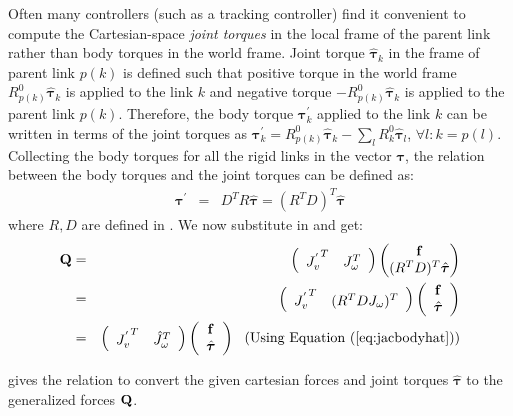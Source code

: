 Often many controllers (such as a tracking controller) find it convenient to compute the Cartesian-space \emph{joint torques} in the local frame of the parent link rather than body torques in the world frame. Joint torque $\hat{\bm{\tau}}_k$ in the frame of parent link $p(k)$ is defined such that positive torque in the world frame $R^0_{p(k)}\hat{\bm{\tau}}_k$ is applied to the link $k$ and negative torque $-R^0_{p(k)}\hat{\bm{\tau}}_k$ is applied to the parent link $p(k)$. Therefore, the body torque $\bm{\tau}^{'}_k$ applied to the link $k$ can be written in terms of the joint torques as $\bm{\tau}^{'}_k = R^0_{p(k)}\hat{\bm{\tau}}_k - \sum_l R^0_{k} \hat{\bm{\tau}}_l$, $\forall l:k=p(l)$. Collecting the body torques for all the rigid links in the vector $\bm{\tau}$, the relation between the body torques and the joint torques can be defined as:
\begin{eqnarray}
\label{eq:torquesbodyhat}
\bm{\tau}^{'} & = & D^T R \hat{\bm{\tau}} = (R^T D)^T \hat{\bm{\tau}}
\end{eqnarray}
where $R, D$ are defined in . We now substitute  in  and get:
\begin{eqnarray}
\label{eq:torques_cart2gen}
\nonumber
\vc{Q} & = & 
\left (
\begin{array}{cc}
{J^{'}_{v}}^T & J_\omega^T
\end{array}
\right )
\begin{pmatrix}
\vc{f} \\
(R^T D)^T \hat{\bm{\tau}}
\end{pmatrix}
 \\
\nonumber
& = & 
\left (
\begin{array}{cc}
{J^{'}_{v}}^T & (R^T D J_\omega)^T
\end{array}
\right )
\left (
\begin{array}{c}
\vc{f} \\
\hat{\bm{\tau}}
\end{array}
\right )
\\
& = & 
\left (
\begin{array}{cc}
{J^{'}_{v}}^T & \hat{J}_\omega^T
\end{array}
\right )
\left (
\begin{array}{c}
\vc{f} \\
\hat{\bm{\tau}}
\end{array}
\right )  \mbox{\ \ (Using \eqnref{jacbodyhat})}
\end{eqnarray}

 gives the relation to convert the given cartesian forces  and joint torques $\hat{\bm{\tau}}$ to the generalized forces $\mathbf{Q}$. 

